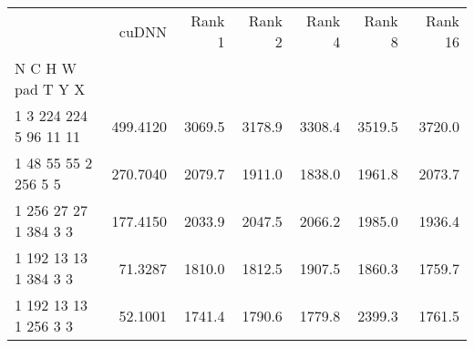 \begin{tabular}{lrrrrrr}
\toprule
{} &     cuDNN &   Rank 1 &   Rank 2 &   Rank 4 &   Rank 8 &   Rank 16 \\
N C H W pad T Y X      &           &          &          &          &          &           \\
\midrule
1 3 224 224 5 96 11 11 &  499.4120 &   3069.5 &   3178.9 &   3308.4 &   3519.5 &    3720.0 \\
1 48 55 55 2 256 5 5   &  270.7040 &   2079.7 &   1911.0 &   1838.0 &   1961.8 &    2073.7 \\
1 256 27 27 1 384 3 3  &  177.4150 &   2033.9 &   2047.5 &   2066.2 &   1985.0 &    1936.4 \\
1 192 13 13 1 384 3 3  &   71.3287 &   1810.0 &   1812.5 &   1907.5 &   1860.3 &    1759.7 \\
1 192 13 13 1 256 3 3  &   52.1001 &   1741.4 &   1790.6 &   1779.8 &   2399.3 &    1761.5 \\
\bottomrule
\end{tabular}
